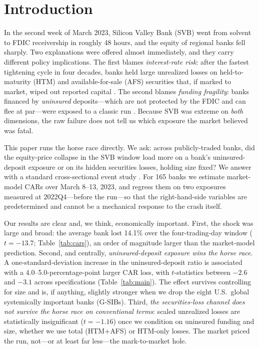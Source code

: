 \documentclass[12pt]{article}
\begin{document}
\newpage
\section{Introduction}\label{sec:intro}
In the second week of March 2023, Silicon Valley Bank (SVB) went from solvent to
FDIC receivership in roughly 48 hours, and the equity of regional banks fell sharply.
Two explanations were offered almost immediately, and they carry different policy
implications. The first blames \emph{interest-rate risk}: after the fastest tightening
cycle in four decades, banks held large unrealized losses on held-to-maturity (HTM) and
available-for-sale (AFS) securities that, if marked to market, wiped out reported capital
\citep{jiang2024}. The second blames \emph{funding fragility}: banks financed by
\emph{uninsured} deposits---which are not protected by the FDIC and can flee at par---were
exposed to a classic run \citep{diamond1983,egan2017}. Because SVB was extreme on
\emph{both} dimensions, the raw failure does not tell us which exposure the market believed
was fatal.

This paper runs the horse race directly. We ask: across publicly-traded banks, did the
equity-price collapse in the SVB window load more on a bank's uninsured-deposit exposure
or on its hidden securities losses, holding size fixed? We answer with a standard
cross-sectional event study \citep{mackinlay1997}. For 165 banks we estimate market-model
CARs over March 8--13, 2023, and regress them on two exposures measured at 2022Q4---before
the run---so that the right-hand-side variables are predetermined and cannot be a mechanical
response to the crash itself.

Our results are clear and, we think, economically important. First, the shock was large
and broad: the average bank lost 14.1\% over the four-trading-day window
($t=-13.7$; Table~\ref{tab:cars}), an order of magnitude larger than the market-model
prediction. Second, and centrally, \emph{uninsured-deposit exposure wins the horse race}.
A one-standard-deviation increase in the uninsured-deposit ratio is associated with a
4.0--5.0-percentage-point larger CAR loss, with $t$-statistics between $-2.6$ and $-3.1$
across specifications (Table~\ref{tab:main}). The effect survives controlling for size and
is, if anything, slightly stronger when we drop the eight U.S.\ global systemically
important banks (G-SIBs). Third, \emph{the securities-loss channel does not survive the
horse race on conventional terms}: scaled unrealized losses are statistically insignificant
($t=-1.16$) once we condition on uninsured funding and size, whether we use total
(HTM$+$AFS) or HTM-only losses. The market priced the run, not---or at least far less---the
mark-to-market hole.
\end{document}
